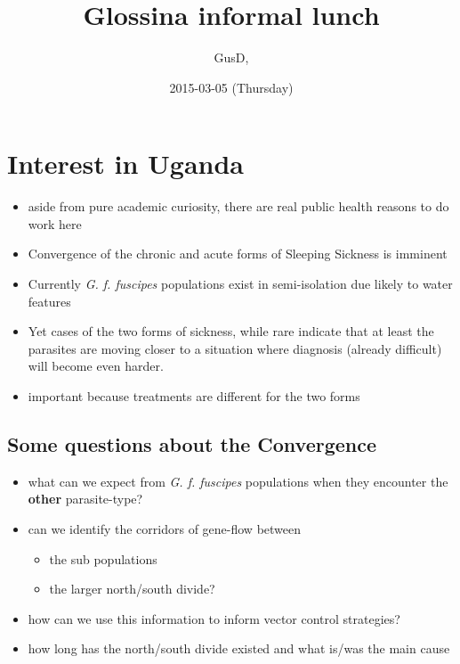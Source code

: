 \documentclass[letterpaper]{scrartcl}
\title{Glossina informal lunch}
\author{GusD,}
\date{2015-03-05 (Thursday)}
\begin{document}
\maketitle

{
\hypersetup{linkcolor=black}
\setcounter{tocdepth}{3}
\tableofcontents
}
\section{Interest in Uganda}\label{interest-in-uganda}

\begin{itemize}
\itemsep1pt\parskip0pt
\item
  aside from pure academic curiosity, there are real public health
  reasons to do work here
\item
  Convergence of the chronic and acute forms of Sleeping Sickness is
  imminent
\item
  Currently \emph{G. f. fuscipes} populations exist in semi-isolation
  due likely to water features
\item
  Yet cases of the two forms of sickness, while rare indicate that at
  least the parasites are moving closer to a situation where diagnosis
  (already difficult) will become even harder.
\item
  important because treatments are different for the two forms
\end{itemize}

\subsection{Some questions about the
Convergence}\label{some-questions-about-the-convergence}

\begin{itemize}
\itemsep1pt\parskip0pt
\item
  what can we expect from \emph{G. f. fuscipes} populations when they
  encounter the \textbf{other} parasite-type?
\item
  can we identify the corridors of gene-flow between

  \begin{itemize}
  \itemsep1pt\parskip0pt
  \item
    the sub populations
  \item
    the larger north/south divide?
  \end{itemize}
\item
  how can we use this information to inform vector control strategies?
\item
  how long has the north/south divide existed and what is/was the main
  cause
\end{itemize}
\end{document}
